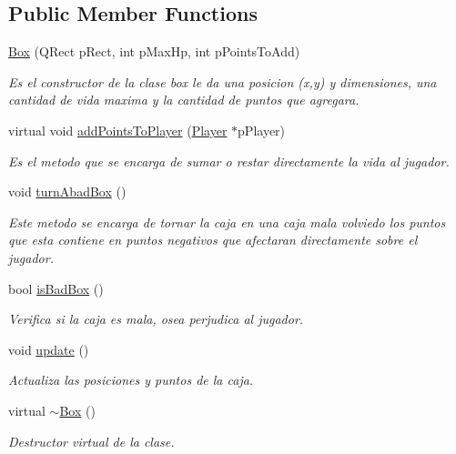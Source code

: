 \subsection*{Public Member Functions}
\begin{DoxyCompactItemize}
\item 
\hyperlink{class_box_a12c7c3f710d76e599a31e7a41784f613}{Box} (Q\-Rect p\-Rect, int p\-Max\-Hp, int p\-Points\-To\-Add)
\begin{DoxyCompactList}\small\item\em Es el constructor de la clase box le da una posicion (x,y) y dimensiones, una cantidad de vida maxima y la cantidad de puntos que agregara. \end{DoxyCompactList}\item 
virtual void \hyperlink{class_box_a536c605982fc2000fbda0388d0a2fb2b}{add\-Points\-To\-Player} (\hyperlink{class_player}{Player} $\ast$p\-Player)
\begin{DoxyCompactList}\small\item\em Es el metodo que se encarga de sumar o restar directamente la vida al jugador. \end{DoxyCompactList}\item 
void \hyperlink{class_box_a82b510b4e487f29189b19699ebaaebae}{turn\-Abad\-Box} ()
\begin{DoxyCompactList}\small\item\em Este metodo se encarga de tornar la caja en una caja mala volviedo los puntos que esta contiene en puntos negativos que afectaran directamente sobre el jugador. \end{DoxyCompactList}\item 
bool \hyperlink{class_box_a1d84b0a091465889a6e587c4f9072482}{is\-Bad\-Box} ()
\begin{DoxyCompactList}\small\item\em Verifica si la caja es mala, osea perjudica al jugador. \end{DoxyCompactList}\item 
void \hyperlink{class_box_a779104150a6f06da2bf1500489a58530}{update} ()
\begin{DoxyCompactList}\small\item\em Actualiza las posiciones y puntos de la caja. \end{DoxyCompactList}\item 
virtual \hyperlink{class_box_a6a5e09398e85d602a046b429062fb9c2}{$\sim$\-Box} ()
\begin{DoxyCompactList}\small\item\em Destructor virtual de la clase. \end{DoxyCompactList}\end{DoxyCompactItemize}
